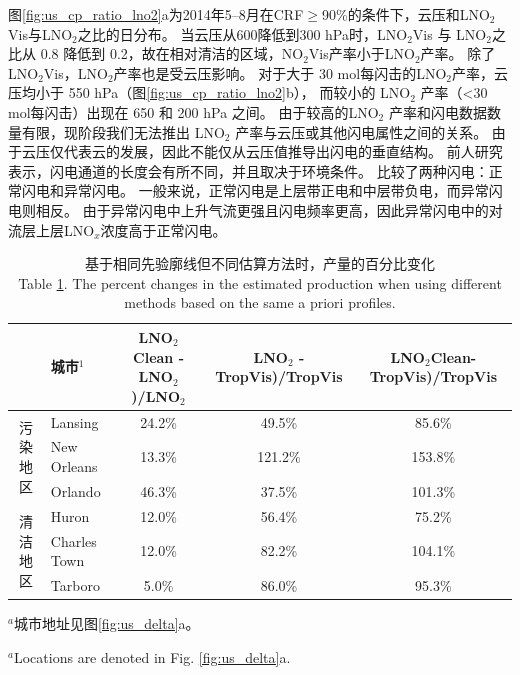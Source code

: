 图\ref{fig:us_cp_ratio_lno2}a为2014年5--8月在CRF$\geq$90\%的条件下，云压和LNO$_2$Vis与LNO$_2$之比的日分布。
当云压从600降低到300 hPa时，LNO$_2$Vis 与 LNO$_2$之比从 0.8 降低到 0.2，故在相对清洁的区域，NO$_2$Vis产率小于LNO$_2$产率。
除了 LNO$_2$Vis，LNO$_2$产率也是受云压影响。
对于大于 30 mol每闪击的LNO$_2$产率，云压均小于 550 hPa（图\ref{fig:us_cp_ratio_lno2}b），
而较小的 LNO$_2$ 产率（<30 mol每闪击）出现在 650 和 200 hPa 之间。
由于较高的LNO$_2$ 产率和闪电数据数量有限，现阶段我们无法推出 LNO$_2$ 产率与云压或其他闪电属性之间的关系。
由于云压仅代表云的发展，因此不能仅从云压值推导出闪电的垂直结构。
前人研究表示，闪电通道的长度会有所不同，并且取决于环境条件\citep{Carey.2016,Mecikalski.2017,Fuchs.2018}。
\citet{Davis.2019}比较了两种闪电：正常闪电和异常闪电。
一般来说，正常闪电是上层带正电和中层带负电，而异常闪电则相反\citep{Williams.1989}。
由于异常闪电中上升气流更强且闪电频率更高，因此异常闪电中的对流层上层LNO$_x$浓度高于正常闪电。


\begin{table}[htbp]
\caption{基于相同先验廓线但不同估算方法时，产量的百分比变化\\Table \ref{table:production_comp}. The percent changes in the estimated production when using different methods based on the same a priori profiles.}
\scriptsize
\begin{tabular}{clccc}
\hline
 & 城市$^1$ & LNO$_2$Clean - LNO$_2$)/LNO$_2$ & LNO$_2$ - TropVis)/TropVis & LNO$_2$Clean-TropVis)/TropVis \\
\hline
\multirow{3}{*}{污染地区} & Lansing          & 24.2\%  & 49.5\%   & 85.6\%   \\
                         & New Orleans      & 13.3\%  & 121.2\%  & 153.8\%  \\
                         & Orlando          & 46.3\%  & 37.5\%   & 101.3\%  \\
\hline
\multirow{3}{*}{清洁地区}    & Huron            & 12.0\%  & 56.4\%   & 75.2\%   \\
                            & Charles Town     & 12.0\%  & 82.2\%   & 104.1\%  \\
                            & Tarboro          & 5.0\%   & 86.0\%   & 95.3\%   \\
\hline
\end{tabular}
\begin{tablenotes}
\footnotesize
\item $^a$城市地址见图\ref{fig:us_delta}a。
\item $^a$Locations are denoted in Fig. \ref{fig:us_delta}a.
\end{tablenotes}
\label{table:production_comp}
\end{table}

